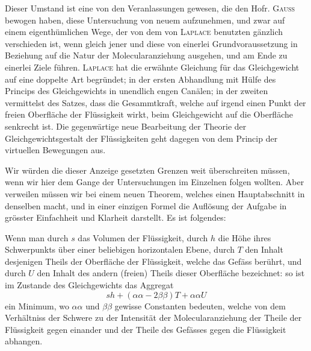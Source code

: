 Dieser Umstand ist eine von den Veranlassungen gewesen, die den Hofr.
\textsc{Gauss} bewogen haben, diese Untersuchung von neuem aufzunehmen, und zwar
auf einem eigenthümlichen Wege, der von dem von \textsc{Laplace} benutzten gänzlich
verschieden ist, wenn gleich jener und diese von einerlei Grundvoraussetzung in
Beziehung auf die Natur der Molecularanziehung ausgehen, und am Ende zu einerlei
Ziele führen. \textsc{Laplace} hat die erwähnte Gleichung für das Gleichgewicht
auf eine doppelte Art begründet; in der ersten Abhandlung mit Hülfe des Princips
des Gleichgewichts in unendlich engen Canälen; in der zweiten vermittelst des
Satzes, dass die Gesammtkraft, welche auf irgend einen Punkt der freien Oberfläche
der Flüssigkeit wirkt, beim Gleichgewicht auf die Oberfläche senkrecht ist. Die
gegenwärtige neue Bearbeitung der Theorie der Gleichgewichtsgestalt der Flüssigkeiten
geht dagegen von dem Princip der virtuellen Bewegungen aus.

Wir würden die dieser Anzeige gesetzten Grenzen weit überschreiten müssen,
wenn wir hier dem Gange der Untersuchungen im Einzelnen folgen wollten. Aber
verweilen müssen wir bei einem neuen Theorem, welches einen Hauptabschnitt in
denselben macht, und in einer einzigen Formel die Auflösung der Aufgabe in
grösster Einfachheit und Klarheit darstellt. Es ist folgendes:

Wenn man durch $s$ das Volumen der Flüssigkeit, durch $h$ die Höhe ihres
Schwerpunkts über einer beliebigen horizontalen Ebene, durch $T$ den Inhalt
\clearpage
{}
\noindent
desjenigen Theils der Oberfläche der Flüssigkeit, welche das Gefäss berührt,
und durch $U$ den Inhalt des andern (freien) Theils dieser Oberfläche bezeichnet:
so ist im Zustande des Gleichgewichts das Aggregat
\[
sh+(\alpha\alpha-2\beta\beta)T+\alpha\alpha U
\]
ein Minimum, wo $\alpha\alpha$ und $\beta\beta$ gewisse Constanten bedeuten,
welche von dem Verhältniss der Schwere zu der Intensität der Molecularanziehung
der Theile der Flüssigkeit gegen einander und der Theile des Gefässes gegen
die Flüssigkeit abhangen.

